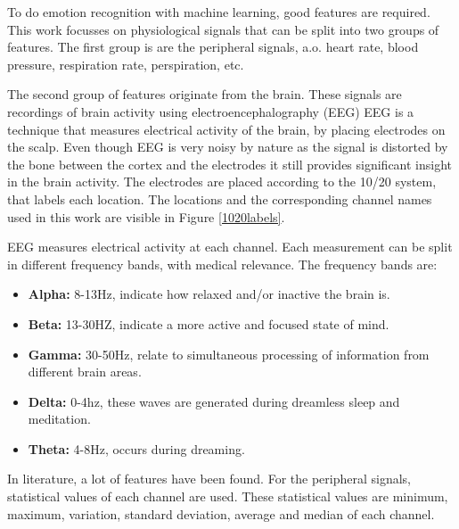 \npar

To do emotion recognition with machine learning, good features are required. This work focusses on physiological signals that can be split into two groups of features. The first group is are the peripheral signals, a.o. heart rate, blood pressure, respiration rate, perspiration, etc. 

\npar

The second group of features originate from the brain. These signals are recordings of brain activity using electroencephalography (EEG) %
EEG is a technique that measures electrical activity of the brain, by placing electrodes on the scalp. Even though EEG is very noisy by nature as the signal is distorted by the bone between the cortex and the electrodes it still provides significant insight in the brain activity. The electrodes are placed according to the 10/20 system, that labels each location. The locations and the corresponding channel names used in this work are visible in Figure \ref{1020labels}.


EEG measures electrical activity at each channel. Each measurement can be split in different frequency bands, with medical relevance. The frequency bands are:
\begin{itemize}
\item \textbf{Alpha:} 8-13Hz, indicate how relaxed and/or inactive the brain is.
\item \textbf{Beta:} 13-30HZ, indicate a more active and focused state of mind.
\item \textbf{Gamma:} 30-50Hz, relate to simultaneous processing of information from different brain areas.
\item \textbf{Delta:} 0-4hz, these waves are generated during dreamless sleep and meditation.
\item \textbf{Theta:} 4-8Hz, occurs during dreaming.
\end{itemize}

\npar
In literature, a lot of features have been found. For the peripheral signals, statistical values of each channel are used. These statistical values are minimum, maximum, variation, standard deviation, average and median of each channel. 

\npar

